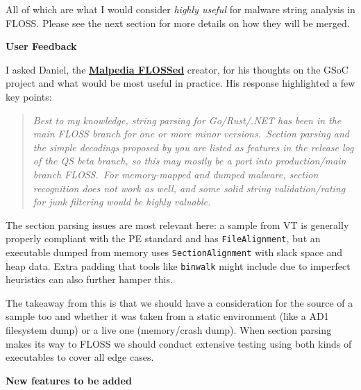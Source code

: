 \documentclass[12pt]{article}
\begin{document}
All of which are what I would consider \textit{highly useful} for malware string analysis in FLOSS. Please see the next section for more details on how they will be merged.

\textbf{User Feedback}

I asked Daniel, the \href{https://danielplohmann.github.io/blog/2024/03/08/malpediaflossed.html}{\textbf{Malpedia FLOSSed}} creator, for his thoughts on the GSoC project and what would be most useful in practice. His response highlighted a few key points:

\begin{quote}
\textit{Best to my knowledge, string parsing for Go/Rust/.NET has been in the main FLOSS branch for one or more minor versions.}\
\textit{Section parsing and the simple decodings proposed by you are listed as features in the release log of the QS beta branch, so this may mostly be a port into production/main branch FLOSS.}\
\textit{For memory-mapped and dumped malware, section recognition does not work as well, and some solid string validation/rating for junk filtering would be highly valuable.}
\end{quote}

The section parsing issues are most relevant here: a sample from VT is generally properly compliant with the PE standard and has \texttt{FileAlignment}, but an executable dumped from memory uses \texttt{SectionAlignment} with slack space and heap data. Extra padding that tools like \texttt{binwalk} might include due to imperfect heuristics can also further hamper this.

The takeaway from this is that we should have a consideration for the source of a sample too and whether it was taken from a static environment (like a AD1 filesystem dump) or a live one (memory/crash dump). When section parsing makes its way to FLOSS we should conduct extensive testing using both kinds of executables to cover all edge cases.

\textbf{New features to be added}
\end{document}
